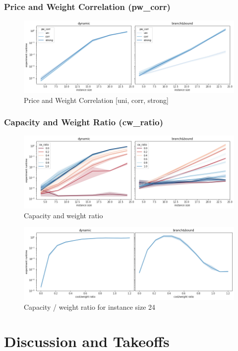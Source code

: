 \documentclass[a4paper,10pt]{article}
\begin{document}
\subsubsection{Price and Weight Correlation (pw\_corr)}

\begin{figure}[!htb]
	\centering
  	\includegraphics[width=\textwidth]{images/pwcorr.png}
	\caption{Price and Weight Correlation [uni, corr, strong]}
	\label{pwcorr}
\end{figure}

\subsubsection{Capacity and Weight Ratio (cw\_ratio)}

\begin{figure}[!htb]
	\centering
  	\includegraphics[width=\textwidth]{images/cwratio.png}
	\caption{Capacity and weight ratio}
	\label{cwratio}
\end{figure}

\begin{figure}[!htb]
	\centering
  	\includegraphics[width=\textwidth]{images/cwratio_fixed.png}
	\caption{Capacity / weight ratio for instance size 24}
	\label{cwratio}
\end{figure}


\section{Discussion and Takeoffs}
\end{document}
